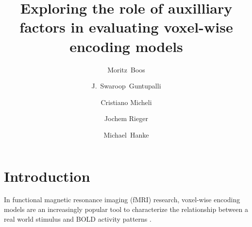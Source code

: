 
\newcommand{\beginsupplement}{%
        \setcounter{table}{0}
        \renewcommand{\thetable}{S\arabic{table}}%
        \setcounter{figure}{0}
        \renewcommand{\thefigure}{S\arabic{figure}}%
     }




\title{Exploring the role of auxilliary factors in evaluating voxel-wise encoding models}


\author[1]{Moritz~Boos}
\author[2]{J.~Swaroop~Guntupalli}
\author[1]{Cristiano Micheli}
\author[1]{Jochem Rieger}
\author[3,4]{Michael~Hanke}

\maketitle

\listoftodos

\begin{abstract}

\end{abstract}

\clearpage


\section*{Introduction}

In functional magnetic resonance imaging (f{MRI}) research, voxel-wise encoding
models  are an increasingly popular tool to characterize the relationship
between a real world stimulus and BOLD activity patterns
\citep{NG11,TD+06,KG+08,SZ09}.


